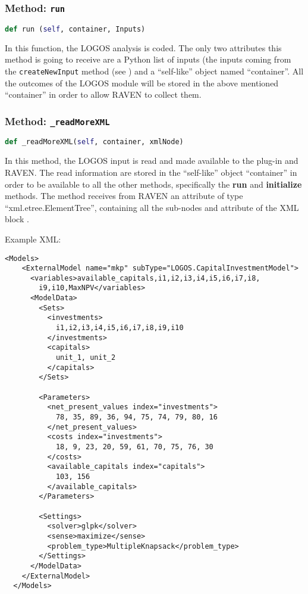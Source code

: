 \subsubsection{Method: \texttt{run}}
\label{subsubsec:runExternalModelPlugin}
\begin{lstlisting}[language=python]
def run (self, container, Inputs)
\end{lstlisting}

In this function, the LOGOS analysis is coded.
%
The only two attributes this method is going to receive are a Python list of inputs
(the inputs coming from the \texttt{createNewInput} method (see \cite{RAVENuserManual})
and a ``self-like'' object named ``container''.
%
All the outcomes of the LOGOS module will be stored in the above mentioned ``container''
in order to allow RAVEN to collect them.

\subsubsection{Method: \texttt{\_readMoreXML}}
\label{subsubsec:externalReadMoreXMLExternalModelPlugin}
\begin{lstlisting}[language=python]
def _readMoreXML(self, container, xmlNode)
\end{lstlisting}
In this method, the LOGOS input is read and made available to the plug-in and RAVEN.
%
The read information are stored in the ``self-like'' object ``container''
in order to be available to all the other methods, specifically the  \textbf{run}
and  \textbf{initialize} methods.
%
The method receives from RAVEN an attribute of type ``xml.etree.ElementTree'',
containing all the sub-nodes and attribute of the XML block .
%

Example XML:
\begin{lstlisting}[style=XML,morekeywords={subType,ModuleToLoad}]
  <Models>
    <ExternalModel name="mkp" subType="LOGOS.CapitalInvestmentModel">
      <variables>available_capitals,i1,i2,i3,i4,i5,i6,i7,i8,
        i9,i10,MaxNPV</variables>
      <ModelData>
        <Sets>
          <investments>
            i1,i2,i3,i4,i5,i6,i7,i8,i9,i10
          </investments>
          <capitals>
            unit_1, unit_2
          </capitals>
        </Sets>

        <Parameters>
          <net_present_values index="investments">
            78, 35, 89, 36, 94, 75, 74, 79, 80, 16
          </net_present_values>
          <costs index="investments">
            18, 9, 23, 20, 59, 61, 70, 75, 76, 30
          </costs>
          <available_capitals index="capitals">
            103, 156
          </available_capitals>
        </Parameters>

        <Settings>
          <solver>glpk</solver>
          <sense>maximize</sense>
          <problem_type>MultipleKnapsack</problem_type>
        </Settings>
      </ModelData>
    </ExternalModel>
  </Models>
\end{lstlisting}

